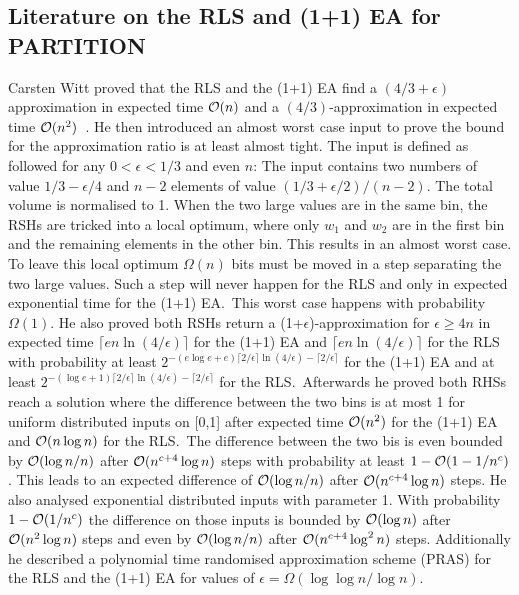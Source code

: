 \subsection{Literature on the RLS and (1+1) EA for PARTITION}
Carsten Witt proved that the RLS and the (1+1) EA find a $(4/3+\epsilon)$ approximation in expected time $\mathcal{O}(n)$ and a $(4/3)$-approximation in expected time $\mathcal{O}(n^2)$~\cite{witt2005worst}.
He then introduced an almost worst case input to prove the bound for the approximation ratio is at least almost tight.
The input is defined as followed for any $0<\epsilon<1/3$ and even $n$:\newline
The input contains two numbers of value $1/3 - \epsilon/4$ and $n-2$ elements of value\newline
$(1/3+\epsilon/2)/(n-2)$. 
The total volume is normalised to 1.
When the two large values are in the same bin, the RSHs are tricked into a local optimum, where only $w_1$ and $w_2$ are in the first bin and the remaining elements in the other bin.
This results in an almost worst case.
To leave this local optimum $\Omega(n)$ bits must be moved in a step separating the two large values.
Such a step will never happen for the RLS and only in expected exponential time for the (1+1) EA.\
This worst case happens with probability $\Omega(1)$.
He also proved both RSHs return a (1+$\epsilon$)-approximation for $\epsilon\ge4n$ in expected time \(\lceil en\ln(4/\epsilon)\rceil\) for the (1+1) EA and \(\lceil en\ln(4/\epsilon)\rceil\) for the RLS with probability at least \(2^{-(e\log{e}+e)\lceil 2/\epsilon\rceil \ln(4/\epsilon)-\lceil 2/\epsilon\rceil}\) for the (1+1) EA and at least \(2^{-(\log{e}+1)\lceil 2/\epsilon\rceil \ln(4/\epsilon)-\lceil 2/\epsilon\rceil}\) for the RLS.\
Afterwards he proved both RHSs reach a solution where the difference between the two bins is at most 1 for uniform distributed inputs on [0,1] after expected time $\mathcal{O}(n^2)$ for the (1+1) EA and $\mathcal{O}(n\log{n})$ for the RLS.\
The difference between the two bis is even bounded by $\mathcal{O}(\log{n}/n)$ after $\mathcal{O}(n^{c+4}\log{n})$ steps with probability at least $1-\mathcal{O}(1-1/n^c)$.
This leads to an expected difference of $\mathcal{O}(\log{n}/n)$ after $\mathcal{O}(n^{c+4}\log{n})$ steps.
He also analysed exponential distributed inputs with parameter 1.
With probability $1-\mathcal{O}(1/n^c)$ the difference on those inputs is bounded by $\mathcal{O}(\log{n})$ after $\mathcal{O}(n^2\log{n})$ steps and even by $\mathcal{O}(\log{n}/n)$ after $\mathcal{O}(n^{c+4}\log^2{n})$ steps.
Additionally he described a polynomial time randomised approximation scheme (PRAS) for the RLS and the (1+1) EA for values of $\epsilon=\Omega(\log{\log{}}n/\log{n})$.\newline
